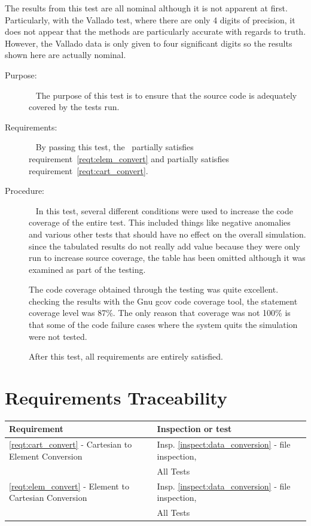 \begin{description}
The results from this test are all nominal although it is not apparent at
first.  Particularly, with the Vallado test, where there are only 4 digits
of precision, it does not appear that the methods are particularly accurate
with regards to truth.  However, the Vallado data is only given to four
significant digits so the results shown here are actually nominal.

\end{description}

\label{test:code_coverage}
\begin{description}
\item[Purpose:] \ \newline
The purpose of this test is to ensure that the source code is adequately
covered by the tests run.
\item[Requirements:] \ \newline
By passing this test, the \OrbitalElement\ partially satisfies
requirement~\ref{reqt:elem_convert} and partially satisfies
requirement~\ref{reqt:cart_convert}.
\item[Procedure:]\ \newline
In this test, several different conditions were used to increase the code
coverage of the entire test.  This included things like negative anomalies and
various other tests that should have no effect on the overall simulation.
since the tabulated results do not really add value because they were only
run to increase source coverage, the table has been omitted although it was
examined as part of the testing.

The code coverage obtained through the testing was quite excellent.
checking the results with  the Gnu gcov code coverage tool,
the statement coverage
level was 87\%.  The only reason that coverage was not 100\% is that some of
the code failure cases where the system quits the simulation were not tested.

After this test, all requirements are entirely satisfied.


\end{description}

\section{Requirements Traceability}\label{sec:traceability}

\begin{tabular}{||l|l|l|} \hline
{\bf Requirement} & {\bf Inspection or test} \\ \hline \hline
\ref{reqt:cart_convert} - Cartesian to Element Conversion &
  Insp. \ref{inspect:data_conversion} - file inspection, \\
 & All Tests \\ \hline
\ref{reqt:elem_convert} - Element to Cartesian Conversion &
   Insp. \ref{inspect:data_conversion} - file inspection, \\
 & All Tests \\
\hline
\end{tabular}

